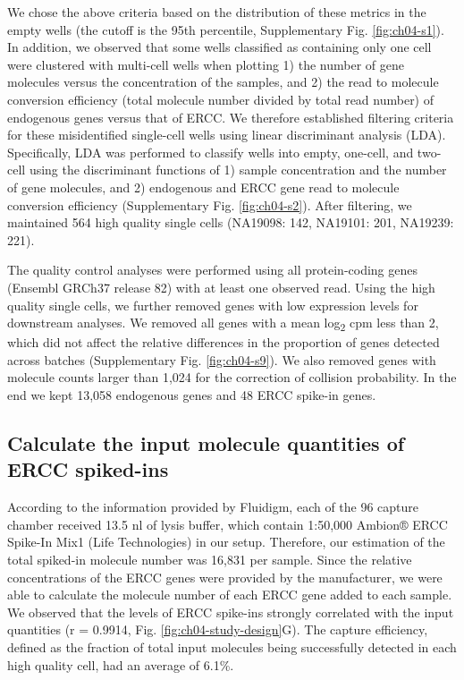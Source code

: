 We chose the above criteria based on the distribution of these metrics
in the empty wells (the cutoff is the 95th percentile, Supplementary
Fig. \ref{fig:ch04-s1}). In addition, we observed that some wells classified as
containing only one cell were clustered with multi-cell wells when
plotting 1) the number of gene molecules versus the concentration of the
samples, and 2) the read to molecule conversion efficiency (total
molecule number divided by total read number) of endogenous genes versus
that of ERCC. We therefore established filtering criteria for these
misidentified single-cell wells using linear discriminant analysis
(LDA). Specifically, LDA was performed to classify wells into empty,
one-cell, and two-cell using the discriminant functions of 1) sample
concentration and the number of gene molecules, and 2) endogenous and
ERCC gene read to molecule conversion efficiency (Supplementary Fig.
\ref{fig:ch04-s2}). After filtering, we maintained 564 high quality single cells
(NA19098: 142, NA19101: 201, NA19239: 221).

The quality control analyses were performed using all protein-coding
genes (Ensembl GRCh37 release 82) with at least one observed read. Using
the high quality single cells, we further removed genes with low
expression levels for downstream analyses. We removed all genes with a
mean log\textsubscript{2} cpm less than 2, which did not affect the
relative differences in the proportion of genes detected across batches
(Supplementary Fig. \ref{fig:ch04-s9}). We also removed genes with molecule counts
larger than 1,024 for the correction of collision probability. In the
end we kept 13,058 endogenous genes and 48 ERCC spike-in genes.

\subsection{Calculate the input molecule quantities of ERCC
spiked-ins}\label{calculate-the-input-molecule-quantities-of-ercc-spiked-ins}

According to the information provided by Fluidigm, each of the 96
capture chamber received 13.5 nl of lysis buffer, which contain 1:50,000
Ambion® ERCC Spike-In Mix1 (Life Technologies) in our setup. Therefore,
our estimation of the total spiked-in molecule number was 16,831 per
sample. Since the relative concentrations of the ERCC genes were
provided by the manufacturer, we were able to calculate the molecule
number of each ERCC gene added to each sample. We observed that the
levels of ERCC spike-ins strongly correlated with the input quantities
(r = 0.9914, Fig. \ref{fig:ch04-study-design}G). The capture efficiency, defined as the fraction
of total input molecules being successfully detected in each high
quality cell, had an average of 6.1\%.

